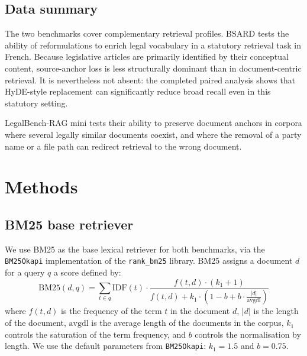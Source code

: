 \documentclass[a4paper,fleqn]{cas-dc}
\begin{document}
\subsection{Data summary}
\begin{center}
\small
{}
\label{tab:datasets}
\end{center}
The two benchmarks cover complementary retrieval profiles. 
BSARD tests the ability of reformulations to enrich
legal vocabulary in a statutory retrieval task in French. Because
legislative articles are primarily identified by their conceptual
content, source-anchor loss is less structurally dominant than in
document-centric retrieval. It is nevertheless not absent: the
completed paired analysis shows that HyDE-style replacement can
significantly reduce broad recall even in this statutory setting.
 
LegalBench-RAG mini tests their ability to preserve document anchors 
in corpora where several legally 
similar documents coexist, and where the removal of a party name or 
a file path can redirect retrieval to the wrong 
document.
\section{Methods}
\subsection{BM25 base retriever}
We use BM25 as the base lexical retriever for both 
benchmarks, via the \texttt{BM25Okapi} implementation of the 
\texttt{rank\_bm25} library. BM25 assigns a document $d$ for a 
query $q$ a score defined by:
\begin{equation}
    \text{BM25}(d, q) = \sum_{t \in q} \text{IDF}(t) \cdot
    \frac{f(t, d) \cdot (k_1 + 1)}
    {f(t, d) + k_1 \cdot \left(1 - b + b \cdot
         \frac{|d|}{\text{avgdl}}\right)}
\end{equation}
where $f(t, d)$ is the frequency of the term $t$ in the document $d$, 
$|d|$ is the length of the document, $\text{avgdl}$ is the 
average length of the documents in the corpus, $k_1$ controls the saturation of 
the term frequency, and $b$ controls the normalisation by 
length. We use the default parameters from 
\texttt{BM25Okapi}: $k_1 = 1.5$ and $b = 0.75$.
\end{document}
